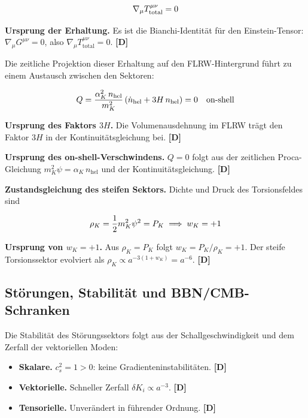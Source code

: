 ﻿\documentclass[11pt,letterpaper]{article}
\begin{document}
\begin{equation*}
  \resizebox{\ifdim\width>\linewidth \linewidth\else\width\fi}{!}{$\displaystyle \nabla_\mu T^{\mu\nu}_{\text{total}} = 0$}
\end{equation*}

\textbf{Ursprung der Erhaltung.} Es ist die Bianchi-Identität für den Einstein-Tensor: $\nabla_\mu G^{\mu\nu} = 0$, also $\nabla_\mu T^{\mu\nu}_{\text{total}} = 0$. \textbf{[D]}

Die zeitliche Projektion dieser Erhaltung auf den FLRW-Hintergrund führt zu einem Austausch zwischen den Sektoren:

\begin{equation*}
  \resizebox{\ifdim\width>\linewidth \linewidth\else\width\fi}{!}{$\displaystyle Q = \frac{\alpha_K^2\,n_{\text{hel}}}{m_K^2}\left(\dot n_{\text{hel}} + 3H\,n_{\text{hel}}\right) = 0 \quad \text{on-shell}$}
\end{equation*}

\textbf{Ursprung des Faktors $3H$.} Die Volumenausdehnung im FLRW trägt den Faktor $3H$ in der Kontinuitätsgleichung bei. \textbf{[D]}

\textbf{Ursprung des on-shell-Verschwindens.} $Q = 0$ folgt aus der zeitlichen Proca-Gleichung $m_K^2\psi = \alpha_K\,n_{\text{hel}}$ und der Kontinuitätsgleichung. \textbf{[D]}

\textbf{Zustandsgleichung des steifen Sektors.} Dichte und Druck des Torsionsfeldes sind

\begin{equation*}
  \resizebox{\ifdim\width>\linewidth \linewidth\else\width\fi}{!}{$\displaystyle \rho_K = \frac{1}{2}m_K^2\psi^2 = P_K \implies w_K = +1$}
\end{equation*}

\textbf{Ursprung von $w_K = +1$.} Aus $\rho_K = P_K$ folgt $w_K = P_K/\rho_K = +1$. Der steife Torsionssektor evolviert als $\rho_K \propto a^{-3(1+w_K)} = a^{-6}$. \textbf{[D]}
\subsection{Störungen, Stabilität und BBN/CMB-Schranken}
Die Stabilität des Störungssektors folgt aus der Schallgeschwindigkeit und dem Zerfall der vektoriellen Moden:

\begin{itemize}[leftmargin=*]
\item \textbf{Skalare.} $c_s^2 = 1 > 0$: keine Gradienteninstabilitäten. \textbf{[D]}
\item \textbf{Vektorielle.} Schneller Zerfall $\delta K_i \propto a^{-3}$. \textbf{[D]}
\item \textbf{Tensorielle.} Unverändert in führender Ordnung. \textbf{[D]}
\end{itemize}
\end{document}
